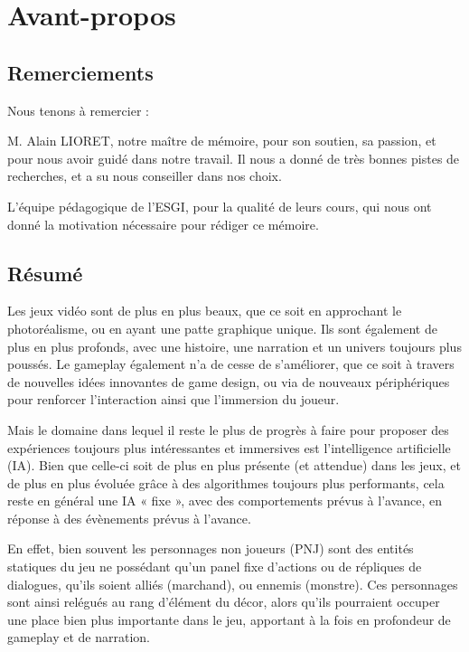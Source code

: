 \documentclass[a4paper, 12pt]{article} %
\begin{document}



\tableofcontents
\newpage
\section{Avant-propos}
\subsection{Remerciements}
Nous tenons à remercier :

M. Alain LIORET, notre maître de mémoire, pour son soutien, sa passion, et pour nous avoir guidé dans notre travail. Il nous a donné de très bonnes pistes de recherches, et a su nous conseiller dans nos choix.

L’équipe pédagogique de l’ESGI, pour la qualité de leurs cours, qui nous ont donné la motivation nécessaire pour rédiger ce mémoire.

\newpage
\subsection{Résumé}
Les jeux vidéo sont de plus en plus beaux, que ce soit en approchant le photoréalisme, ou en ayant une patte graphique unique. Ils sont également de plus en plus profonds, avec une histoire, une narration et un univers toujours plus poussés. Le gameplay également n’a de cesse de s’améliorer, que ce soit à travers de nouvelles idées innovantes de game design, ou via de nouveaux périphériques pour renforcer l’interaction ainsi que l’immersion du joueur. 

Mais le domaine dans lequel il reste le plus de progrès à faire pour proposer des expériences toujours plus intéressantes et immersives est l’intelligence artificielle (IA). Bien que celle-ci soit de plus en plus présente (et attendue) dans les jeux, et de plus en plus évoluée grâce à des algorithmes toujours plus performants, cela reste en général une IA « fixe », avec des comportements prévus à l’avance, en réponse à des évènements prévus à l’avance.

En effet, bien souvent les personnages non joueurs (PNJ) sont des entités statiques du jeu ne possédant qu’un panel fixe d’actions ou de répliques de dialogues, qu’ils soient alliés (marchand), ou ennemis (monstre). Ces personnages sont ainsi relégués au rang d’élément du décor, alors qu’ils pourraient occuper une place bien plus importante dans le jeu, apportant à la fois en profondeur de gameplay et de narration.
\end{document}
